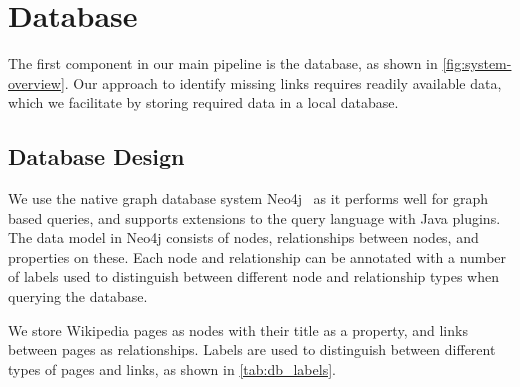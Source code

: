 \section{Database}\label{sec:db}
The first component in our main pipeline is the database, as shown in \cref{fig:system-overview}. Our approach to identify missing links requires readily available data, which we facilitate by storing required data in a local database.

\subsection{Database Design}\label{sec:db_design}
We use the native graph database system Neo4j~\cite{neo4j} as it performs well for graph based queries, and supports extensions to the query language with Java plugins. The data model in Neo4j consists of nodes, relationships between nodes, and properties on these. Each node and relationship can be annotated with a number of labels used to distinguish between different node and relationship types when querying the database.

We store Wikipedia pages as nodes with their title as a property, and links between pages as relationships. Labels are used to distinguish between different types of pages and links, as shown in \cref{tab:db_labels}. 

